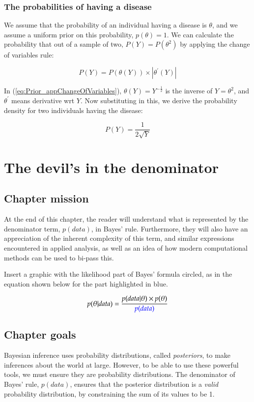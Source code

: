 \documentclass[11pt,fullpage]{book}
\begin{document}
\subsection{The probabilities of having a disease}\label{app:Prior_diseaseJeffreys}
We assume that the probability of an individual having a disease is $\theta$, and we assume a uniform prior on this probability, $p(\theta)=1$. We can calculate the probability that out of a sample of two, $P(Y)=P(\theta^2)$ by applying the change of variables rule:

\begin{equation}\label{eq:Prior_appChangeOfVariables}
P(Y) = P(\theta(Y))\times |\theta^\prime(Y)|
\end{equation}

In (\ref{eq:Prior_appChangeOfVariables}), $\theta(Y)=Y^{-\frac{1}{2}}$ is the inverse of $Y=\theta^2$, and $\theta^\prime$ means derivative wrt $Y$. Now substituting in this, we derive the probability density for two individuals having the disease:

\begin{equation}\label{eq:Prior_appChangeOfVariablesSolved}
P(Y) = \frac{1}{2\sqrt{Y}}
\end{equation}


\chapter{The devil's in the denominator}\label{chap:denominator}
\section{Chapter mission}
At the end of this chapter, the reader will understand what is represented by the denominator term, $p(data)$, in Bayes' rule. Furthermore, they will also have an appreciation of the inherent complexity of this term, and similar expressions encountered in applied analysis, as well as an idea of how modern computational methods can be used to bi-pass this.

Insert a graphic with the likelihood part of Bayes' formula circled, as in the equation shown below for the part highlighted in blue.

\begin{equation}
p(\theta|data) = \frac{p(data|\theta)\times p(\theta)}{{\color{blue}p(data)}}
\end{equation}\label{eq:Denominator_BayesHighlighted}


\section{Chapter goals}
Bayesian inference uses probability distributions, called \textit{posteriors}, to make inferences about the world at large. However, to be able to use these powerful tools, we must ensure they are probability distributions. The denominator of Bayes' rule, $p(data)$, ensures that the posterior distribution is a \textit{valid} probability distribution, by constraining the sum of its values to be 1. 
\end{document}

